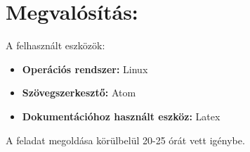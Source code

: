 \documentclass[12pt]{article}
\begin{document}
\newpage
\section*{Megvalósítás:}
A felhasznált eszközök:
\begin{itemize}
  \item \textbf{Operációs rendszer:} Linux
  \item \textbf{Szövegszerkesztő:} Atom
  \item \textbf{Dokumentációhoz használt eszköz:} Latex
\end{itemize}

A feladat megoldása körülbelül 20-25 órát vett igénybe. 
\end{document}
